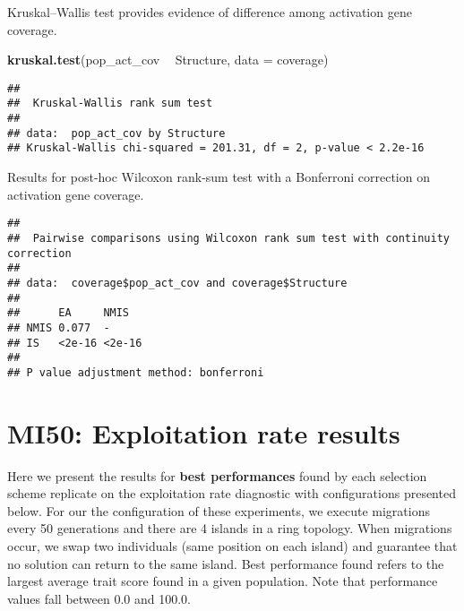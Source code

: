 \documentclass[]{book}
\newenvironment{Shaded}{\begin{snugshade}}{\end{snugshade}}
\newcommand{\DataTypeTok}[1]{\textcolor[rgb]{0.13,0.29,0.53}{#1}}
\newcommand{\KeywordTok}[1]{\textcolor[rgb]{0.13,0.29,0.53}{\textbf{#1}}}
\newcommand{\NormalTok}[1]{#1}
\newcommand{\OperatorTok}[1]{\textcolor[rgb]{0.81,0.36,0.00}{\textbf{#1}}}
\newcommand{\OtherTok}[1]{\textcolor[rgb]{0.56,0.35,0.01}{#1}}
\newcommand{\StringTok}[1]{\textcolor[rgb]{0.31,0.60,0.02}{#1}}
\begin{document}
Kruskal--Wallis test provides evidence of difference among activation gene coverage.

\begin{Shaded}
\begin{Highlighting}[]
\KeywordTok{kruskal.test}\NormalTok{(pop_act_cov }\OperatorTok{~}\StringTok{ }\NormalTok{Structure, }\DataTypeTok{data =}\NormalTok{ coverage)}
\end{Highlighting}
\end{Shaded}

\begin{verbatim}
## 
##  Kruskal-Wallis rank sum test
## 
## data:  pop_act_cov by Structure
## Kruskal-Wallis chi-squared = 201.31, df = 2, p-value < 2.2e-16
\end{verbatim}

Results for post-hoc Wilcoxon rank-sum test with a Bonferroni correction on activation gene coverage.

\begin{Shaded}
\end{Shaded}

\begin{verbatim}
## 
##  Pairwise comparisons using Wilcoxon rank sum test with continuity correction 
## 
## data:  coverage$pop_act_cov and coverage$Structure 
## 
##      EA     NMIS  
## NMIS 0.077  -     
## IS   <2e-16 <2e-16
## 
## P value adjustment method: bonferroni
\end{verbatim}

\hypertarget{mi50-exploitation-rate-results}{%
\chapter{MI50: Exploitation rate results}\label{mi50-exploitation-rate-results}}

Here we present the results for \textbf{best performances} found by each selection scheme replicate on the exploitation rate diagnostic with configurations presented below.
For our the configuration of these experiments, we execute migrations every 50 generations and there are 4 islands in a ring topology.
When migrations occur, we swap two individuals (same position on each island) and guarantee that no solution can return to the same island.
Best performance found refers to the largest average trait score found in a given population.
Note that performance values fall between 0.0 and 100.0.
\end{document}
